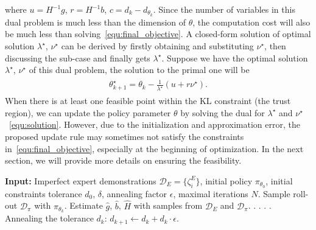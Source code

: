 \documentclass[letterpaper]{article} %
\begin{document}
where $u = H^{-1}g$, $r = H^{-1}b$, $c=d_k-d_{\theta_k}$. Since the number of variables in this dual problem is much less than the dimension of $\theta$, the computation cost will also be much less than solving~\eqref{equ:final_objective}. A closed-form solution of optimal solution $\lambda^\star$, $\nu^\star$ can be derived by firstly obtaining and substituting $\nu^\star$, then discussing the sub-case and finally gets $\lambda^\star$. Suppose we have the optimal solution $\lambda^\star$, $\nu^\star$ of this dual problem, the solution to the primal one will be
\begin{align}
\begin{split}\label{equ:solution}
    \theta_{k+1}^\star = \theta_k - \frac{1}{\lambda^\star}(u + r\nu^\star)\text{.}
\end{split}
\end{align}
When there is at least one feasible point within the KL constraint (the trust region), we can update the policy parameter $\theta$ by solving the dual for $\lambda^\star$ and $\nu^\star$~\eqref{equ:solution}. However, due to the initialization and approximation error, the proposed update rule may sometimes not satisfy the constraints in~\eqref{equ:final_objective}, especially at the beginning of optimization. In the next section, we will provide more details on ensuring the feasibility.

\begin{algorithm}[t!]
\caption{RLfD with a Soft Constraint}
\begin{algorithmic}\label{alg:main}
\STATE \textbf{Input:} Imperfect expert demonstrations $\mathcal{D}_E=\{\zeta_i^E\}$, initial policy $\pi_{\theta_0}$, initial constraints tolerance $d_0$, $\delta$, annealing factor $\epsilon$, maximal iterations $N$.
\STATE Sample roll-out $\mathcal{D}_{\pi}$ with $\pi_{\theta_k}$.
\STATE Estimate $\hat{g}$, $\hat{b}$, $\hat{H}$ with samples from $\mathcal{D}_E$ and $\mathcal{D}_\pi$.
.
.
.
\ELSE
{}.
\ENDIF \\
Annealing the tolerance $d_k$: $d_{k+1} \leftarrow d_k + d_k \cdot \epsilon$.
\ENDFOR\\
\end{algorithmic}
\end{algorithm}
\end{document}

